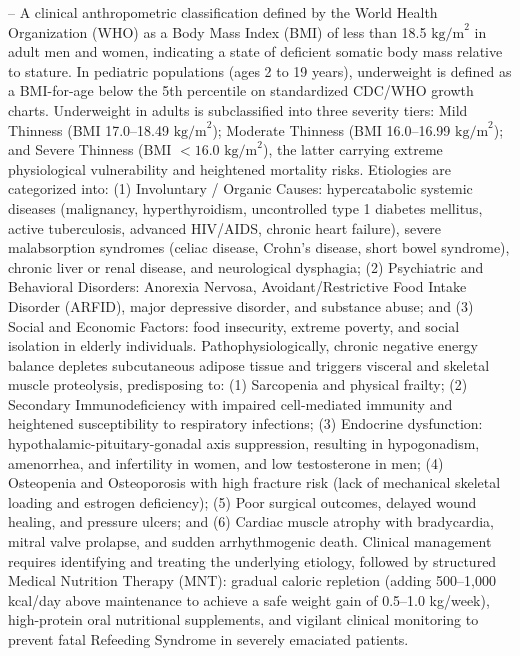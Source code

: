 -- A clinical anthropometric classification defined by the World Health Organization (WHO) as a Body Mass Index (BMI) of less than 18.5 $\text{kg/m}^2$ in adult men and women, indicating a state of deficient somatic body mass relative to stature. In pediatric populations (ages 2 to 19 years), underweight is defined as a BMI-for-age below the 5th percentile on standardized CDC/WHO growth charts. Underweight in adults is subclassified into three severity tiers: Mild Thinness (BMI 17.0--18.49 $\text{kg/m}^2$); Moderate Thinness (BMI 16.0--16.99 $\text{kg/m}^2$); and Severe Thinness (BMI $<16.0\text{ kg/m}^2$), the latter carrying extreme physiological vulnerability and heightened mortality risks. Etiologies are categorized into: (1) Involuntary / Organic Causes: hypercatabolic systemic diseases (malignancy, hyperthyroidism, uncontrolled type 1 diabetes mellitus, active tuberculosis, advanced HIV/AIDS, chronic heart failure), severe malabsorption syndromes (celiac disease, Crohn's disease, short bowel syndrome), chronic liver or renal disease, and neurological dysphagia; (2) Psychiatric and Behavioral Disorders: Anorexia Nervosa, Avoidant/Restrictive Food Intake Disorder (ARFID), major depressive disorder, and substance abuse; and (3) Social and Economic Factors: food insecurity, extreme poverty, and social isolation in elderly individuals. Pathophysiologically, chronic negative energy balance depletes subcutaneous adipose tissue and triggers visceral and skeletal muscle proteolysis, predisposing to: (1) Sarcopenia and physical frailty; (2) Secondary Immunodeficiency with impaired cell-mediated immunity and heightened susceptibility to respiratory infections; (3) Endocrine dysfunction: hypothalamic-pituitary-gonadal axis suppression, resulting in hypogonadism, amenorrhea, and infertility in women, and low testosterone in men; (4) Osteopenia and Osteoporosis with high fracture risk (lack of mechanical skeletal loading and estrogen deficiency); (5) Poor surgical outcomes, delayed wound healing, and pressure ulcers; and (6) Cardiac muscle atrophy with bradycardia, mitral valve prolapse, and sudden arrhythmogenic death. Clinical management requires identifying and treating the underlying etiology, followed by structured Medical Nutrition Therapy (MNT): gradual caloric repletion (adding 500--1,000 kcal/day above maintenance to achieve a safe weight gain of 0.5--1.0 kg/week), high-protein oral nutritional supplements, and vigilant clinical monitoring to prevent fatal Refeeding Syndrome in severely emaciated patients.

